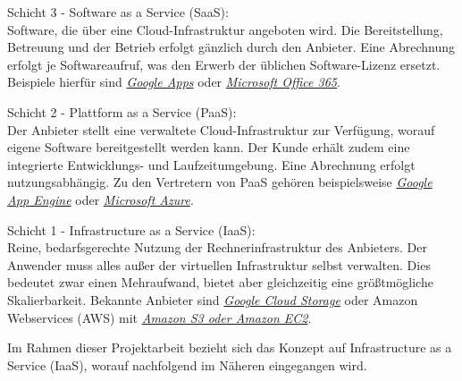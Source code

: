 \documentclass[12pt,a4paper,bibliography=totocnumbered,listof=totocnumbered]{scrartcl}
\begin{document}
\begin{compactitem}
\item Schicht 3 - Software as a Service (SaaS):\\
Software, die über eine Cloud-Infrastruktur angeboten wird. Die Bereitstellung, Betreuung und der Betrieb erfolgt gänzlich durch den Anbieter. Eine Abrechnung erfolgt je Softwareaufruf, was den Erwerb der üblichen Software-Lizenz ersetzt. Beispiele hierfür sind \href{http://www.google.com/enterprise/apps/business/}{\textit{Google Apps}} oder \href{http://office.microsoft.com/de-de/business/was-ist-office-365-fur-unternehmen-FX102997580.aspx}{\textit{Microsoft Office 365}}.
\item Schicht 2 - Plattform as a Service (PaaS):\\
Der Anbieter stellt eine verwaltete Cloud-Infrastruktur zur Verfügung, worauf eigene Software bereitgestellt werden kann. Der Kunde erhält zudem eine integrierte Entwicklungs- und Laufzeitumgebung. Eine Abrechnung erfolgt nutzungsabhängig. Zu den Vertretern von PaaS gehören beispielsweise \href{https://cloud.google.com/appengine/}{\textit{Google App Engine}} oder \href{http://azure.microsoft.com/de-de/}{\textit{Microsoft Azure}}.
\item Schicht 1 - Infrastructure as a Service (IaaS):\\
Reine, bedarfsgerechte Nutzung der Rechnerinfrastruktur des Anbieters. Der Anwender muss alles außer der virtuellen Infrastruktur selbst verwalten. Dies bedeutet zwar einen Mehraufwand, bietet aber gleichzeitig eine größtmögliche Skalierbarkeit. Bekannte Anbieter sind \href{https://cloud.google.com/storage/}{\textit{Google Cloud Storage}} oder Amazon Webservices (AWS) mit \href{http://aws.amazon.com/de/}{\textit{Amazon S3 oder Amazon EC2}}.
\end{compactitem}

Im Rahmen dieser Projektarbeit bezieht sich das Konzept auf Infrastructure as a Service (IaaS), worauf nachfolgend im Näheren eingegangen wird.
\end{document}
